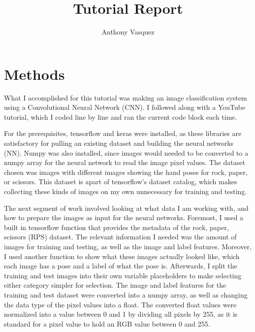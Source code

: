 \documentclass[10pt,twocolumn]{article}
\title{Tutorial Report}
\author{Anthony Vasquez}
\begin{document}
\maketitle

\section{Methods}
What I accomplished for this tutorial was making an image classification system using a Convolutional Neural Network (CNN). I followed along with a YouTube tutorial, which I coded line by line and ran the current code block each time.

For the prerequisites, tensorflow and keras were installed, as these libraries are satisfactory for pulling an existing dataset and building the neural networks (NN). Numpy was also installed, since images would needed to be converted to a numpy array for the neural network to read the image pixel values. The dataset chosen was images with different images showing the hand poses for rock, paper, or scissors. This dataset is apart of tensorflow's dataset catalog, which makes collecting these kinds of images on my own unnecessary for training and testing.

The next segment of work involved looking at what data I am working with, and how to prepare the images as input for the neural networks. Foremost, I used a built in tensorflow function that provides the metadata of the rock, paper, scissors (RPS) dataset. The relevant information I needed was the amount of images for training and testing, as well as the image and label features. Moreover, I used another function to show what these images actually looked like, which each image has a pose and a label of what the pose is. Afterwards, I split the training and test images into their own variable placeholders to make selecting either category simpler for selection. The image and label features for the training and test dataset were converted into a numpy array, as well as changing the data type of the pixel values into a float. The converted float values were normalized into a value between 0 and 1 by dividing all pixels by 255, as it is standard for a pixel value to hold an RGB value between 0 and 255.
\end{document}

